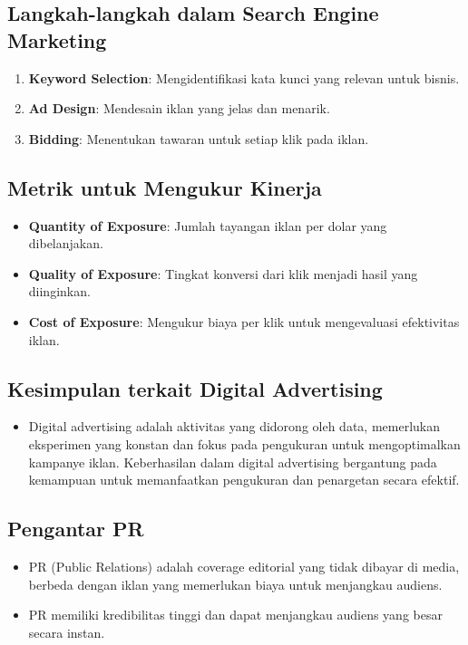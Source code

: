 \documentclass{article}
\begin{document}
\subsection{Langkah-langkah dalam Search Engine Marketing}
\begin{enumerate}
    \item \textbf{Keyword Selection}: Mengidentifikasi kata kunci yang relevan untuk bisnis.
    \item \textbf{Ad Design}: Mendesain iklan yang jelas dan menarik.
    \item \textbf{Bidding}: Menentukan tawaran untuk setiap klik pada iklan.
\end{enumerate}

\subsection{Metrik untuk Mengukur Kinerja}
\begin{itemize}
    \item \textbf{Quantity of Exposure}: Jumlah tayangan iklan per dolar yang dibelanjakan.
    \item \textbf{Quality of Exposure}: Tingkat konversi dari klik menjadi hasil yang diinginkan.
    \item \textbf{Cost of Exposure}: Mengukur biaya per klik untuk mengevaluasi efektivitas iklan.
\end{itemize}

\subsection{Kesimpulan terkait Digital Advertising}
\begin{itemize}
    \item Digital advertising adalah aktivitas yang didorong oleh data, memerlukan eksperimen yang konstan dan fokus pada pengukuran untuk mengoptimalkan kampanye iklan. Keberhasilan dalam digital advertising bergantung pada kemampuan untuk memanfaatkan pengukuran dan penargetan secara efektif.
\end{itemize}

\subsection{Pengantar PR}
\begin{itemize}
    \item PR (Public Relations) adalah coverage editorial yang tidak dibayar di media, berbeda dengan iklan yang memerlukan biaya untuk menjangkau audiens.
    \item PR memiliki kredibilitas tinggi dan dapat menjangkau audiens yang besar secara instan.
\end{itemize}
\end{document}
